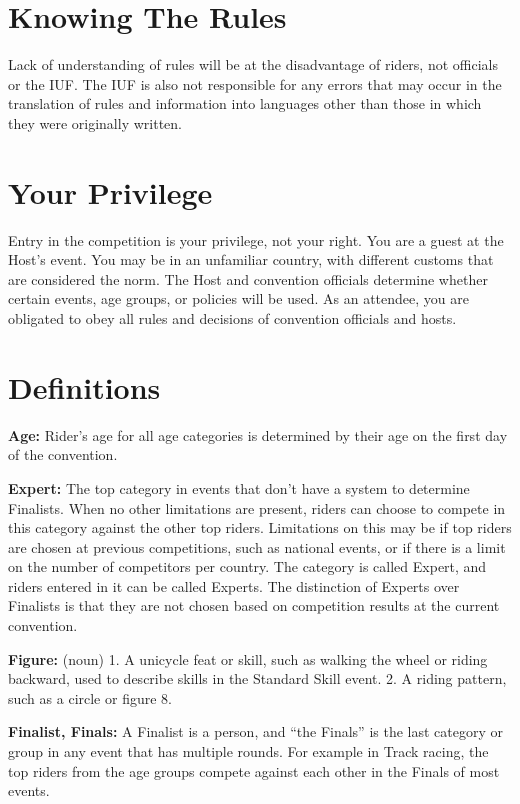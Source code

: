 \section{Knowing The Rules}
Lack of understanding of rules will be at the disadvantage of riders, not officials or the IUF.
The IUF is also not responsible for any errors that may occur in the translation of rules and information into languages other than those in which they were originally written.

\section{Your Privilege}
Entry in the competition is your privilege, not your right.
You are a guest at the Host's event.
You may be in an unfamiliar country, with different customs that are considered the norm.
The Host and convention officials determine whether certain events, age groups, or policies will be used.
As an attendee, you are obligated to obey all rules and decisions of convention officials and hosts.

\section{Definitions}
\textbf{Age:} Rider's age for all age categories is determined by their age on the first day of the convention.

\textbf{Expert:} The top category in events that don't have a system to determine Finalists.
When no other limitations are present, riders can choose to compete in this category against the other top riders.
Limitations on this may be if top riders are chosen at previous competitions, such as national events, or if there is a limit on the number of competitors per country.
The category is called Expert, and riders entered in it can be called Experts.
The distinction of Experts over Finalists is that they are not chosen based on competition results at the current convention.

\textbf{Figure:} (noun) 1. A unicycle feat or skill, such as walking the wheel or riding backward, used to describe skills in the Standard Skill event.
2. A riding pattern, such as a circle or figure 8.

\textbf{Finalist, Finals:} A Finalist is a person, and ``the Finals'' is the last category or group in any event that has multiple rounds.
For example in Track racing, the top riders from the age groups compete against each other in the Finals of most events.


